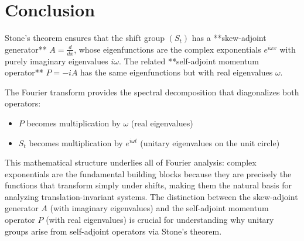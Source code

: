 \documentclass{article}
\begin{document}
\section*{Conclusion}

Stone's theorem ensures that the shift group $(S_t)$ has a **skew-adjoint
generator** $A = \frac{d}{dx}$, whose eigenfunctions are the complex
exponentials $e^{i \omega x}$ with purely imaginary eigenvalues $i \omega$.
The related **self-adjoint momentum operator** $P = - iA$ has the same
eigenfunctions but with real eigenvalues $\omega$.

The Fourier transform provides the spectral decomposition that diagonalizes
both operators:
\begin{itemize}
  \item $P$ becomes multiplication by $\omega$ (real eigenvalues)
  
  \item $S_t$ becomes multiplication by $e^{i \omega t}$ (unitary eigenvalues
  on the unit circle)
\end{itemize}
This mathematical structure underlies all of Fourier analysis: complex
exponentials are the fundamental building blocks because they are precisely
the functions that transform simply under shifts, making them the natural
basis for analyzing translation-invariant systems. The distinction between the
skew-adjoint generator $A$ (with imaginary eigenvalues) and the self-adjoint
momentum operator $P$ (with real eigenvalues) is crucial for understanding why
unitary groups arise from self-adjoint operators via Stone's theorem.
\end{document}
